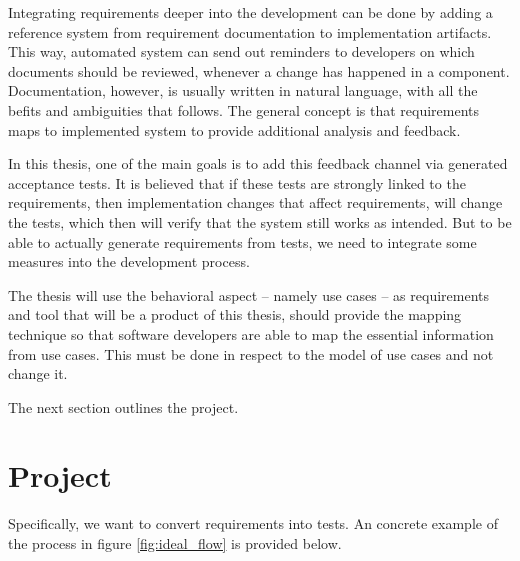 \noindent Integrating requirements deeper into the development can be done by adding a reference system from requirement documentation to implementation artifacts. This way, automated system can send out reminders to developers on which documents should be reviewed, whenever a change has happened in a component. Documentation, however, is usually written in natural language, with all the befits and ambiguities that follows. The general concept is that requirements maps to implemented system to provide additional analysis and feedback.\medskip

\noindent In this thesis, one of the main goals is to add this feedback channel via generated acceptance tests. It is believed that if these tests are strongly linked to the requirements, then implementation changes that affect requirements, will change the tests, which then will verify that the system still works as intended. But to be able to actually generate requirements from tests, we need to integrate some measures into the development process.\medskip

\noindent The thesis will use the behavioral aspect -- namely use cases -- as requirements and tool that will be a product of this thesis, should provide the mapping technique so that software developers are able to map the essential information from use cases. This must be done in respect to the model of use cases and not change it.

\noindent The next section outlines the project.



\section{Project}


Specifically, we want to convert requirements into tests. An concrete example of the process in figure \ref{fig:ideal_flow} is provided below.\medskip

